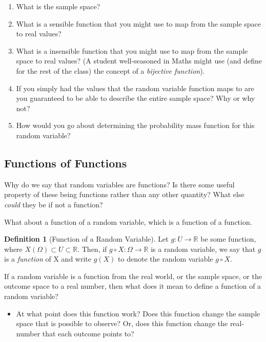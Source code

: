 \documentclass[
]{book}
\providecommand{\tightlist}{%
  \setlength{\itemsep}{0pt}\setlength{\parskip}{0pt}}
\theoremstyle{definition}
\newtheorem{definition}{Definition}[chapter]
\theoremstyle{definition}
\theoremstyle{definition}
\theoremstyle{definition}
\theoremstyle{remark}
\begin{document}
\begin{enumerate}
\def\labelenumi{\arabic{enumi}.}
\tightlist
\item
  What is the sample space?
\item
  What is a sensible function that you might use to map from the sample space to real values?
\item
  What is a insensible function that you might use to map from the sample space to real values? (A student well-seasoned in Maths might use (and define for the rest of the class) the concept of a \emph{bijective function}).
\item
  If you simply had the values that the random variable function maps to are you guaranteed to be able to describe the entire sample space? Why or why not?
\item
  How would you go about determining the probability mass function for this random variable?
\end{enumerate}

\hypertarget{functions-of-functions}{%
\subsection{Functions of Functions}\label{functions-of-functions}}

Why do we say that random variables are functions? Is there some useful property of these being functions rather than any other quantity? What else \emph{could} they be if not a function?

What about a function of a random variable, which is a function of a function.

\begin{definition}[Function of a Random Variable]
Let \(g : U \rightarrow \mathbb{R}\) be some function, where \(X(\Omega) \subset U \subset \mathbb{R}\). Then, if \(g \circ X : \Omega \rightarrow \mathbb{R}\) is a random variable, we say that \(g\) is a \emph{function} of X and write \(g(X)\) to denote the random variable \(g \circ X\).
\end{definition}

If a random variable is a function from the real world, or the sample space, or the outcome space to a real number, then what does it mean to define a function of a random variable?

\begin{itemize}
\tightlist
\item
  At what point does this function work? Does this function change the sample space that is possible to observe? Or, does this function change the real-number that each outcome points to?
\end{itemize}
\end{document}
